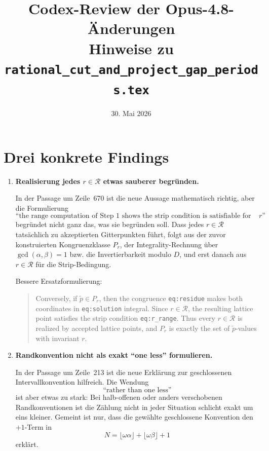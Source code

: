 \documentclass[11pt]{article}
\title{Codex-Review der Opus-4.8-Änderungen\\
\large Hinweise zu \texttt{rational\_cut\_and\_project\_gap\_periods.tex}}
\author{}
\date{30. Mai 2026}
\newcommand{\paperlabel}[1]{\texttt{#1}}
\begin{document}
\maketitle

\section*{Drei konkrete Findings}

\begin{enumerate}[leftmargin=2em]
  \item \textbf{Realisierung jedes \(r\in\mathcal R\) etwas sauberer begründen.}

        In der Passage um Zeile~670 ist die neue Aussage mathematisch richtig,
        aber die Formulierung
        \[
          \text{``the range computation of Step~1 shows the strip condition is
          satisfiable for every such \(r\)''}
        \]
        begründet nicht ganz das, was sie begründen soll.  Dass jedes
        \(r\in\mathcal R\) tatsächlich zu akzeptierten Gitterpunkten führt,
        folgt aus der zuvor konstruierten Kongruenzklasse \(P_r\), der
        Integrality-Rechnung über \(\gcd(\alpha,\beta)=1\) bzw. die
        Invertierbarkeit modulo \(D\), und erst danach aus \(r\in\mathcal R\)
        für die Strip-Bedingung.

        Bessere Ersatzformulierung:
        \begin{quote}
        Conversely, if \(\tilde p\in P_r\), then the congruence
        \paperlabel{eq:residue} makes both coordinates in
        \paperlabel{eq:solution}
        integral.  Since \(r\in\mathcal R\), the resulting lattice point
        satisfies the strip condition \paperlabel{eq:r\_range}.  Thus every
        \(r\in\mathcal R\) is realized by accepted lattice points, and
        \(P_r\) is exactly the set of \(\tilde p\)-values with invariant \(r\).
        \end{quote}

  \item \textbf{Randkonvention nicht als exakt ``one less'' formulieren.}

        In der Passage um Zeile~213 ist die neue Erklärung zur geschlossenen
        Intervallkonvention hilfreich.  Die Wendung
        \[
          \text{``rather than one less''}
        \]
        ist aber etwas zu stark: Bei halb-offenen oder anders verschobenen
        Randkonventionen ist die Zählung nicht in jeder Situation schlicht
        exakt um eins kleiner.  Gemeint ist nur, dass die gewählte geschlossene
        Konvention den \(+1\)-Term in
        \[
          N=\lfloor\omega\alpha\rfloor+\lfloor\omega\beta\rfloor+1
        \]
        erklärt.


\end{enumerate}
\end{document}
